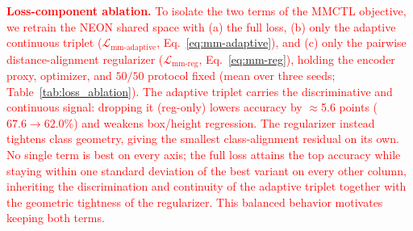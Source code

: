 \documentclass[10pt,twocolumn,letterpaper]{article}
\newcommand{\new}[1]{\textcolor{red}{#1}}
\begin{document}
\new{\noindent\textbf{Loss-component ablation.}
To isolate the two terms of the MMCTL objective, we retrain the NEON shared space with (a) the full loss, (b) only the adaptive continuous triplet ($\mathcal{L}_{\text{mm-adaptive}}$, Eq.~\eqref{eq:mm-adaptive}), and (c) only the pairwise distance-alignment regularizer ($\mathcal{L}_{\text{mm-reg}}$, Eq.~\eqref{eq:mm-reg}), holding the encoder proxy, optimizer, and $50/50$ protocol fixed (mean over three seeds; Table~\ref{tab:loss_ablation}). The adaptive triplet carries the discriminative and continuous signal: dropping it (reg-only) lowers accuracy by $\approx$5.6 points ($67.6\rightarrow62.0\%$) and weakens box/height regression. The regularizer instead tightens class geometry, giving the smallest class-alignment residual on its own. No single term is best on every axis; the full loss attains the top accuracy while staying within one standard deviation of the best variant on every other column, inheriting the discrimination and continuity of the adaptive triplet together with the geometric tightness of the regularizer. This balanced behavior motivates keeping both terms.}

\begin{table}[t]
\centering
\caption{\new{NEON loss-component ablation (torch proxy, $128$-d embeddings, mean over three seeds). \emph{Adaptive} is the continuous triplet with an annotation-derived margin; \emph{reg} is the pairwise distance-alignment term. \textbf{Align-cls} is the class-distance alignment residual (lower is tighter). The adaptive term drives accuracy and continuous regression, the regularizer tightens class geometry, and the full loss combines both. Best per column in bold.}}
\label{tab:loss_ablation}
{\color{red}
}
\end{table}

\subsection{}
\label{subsec:additional-analyses}
\end{document}
